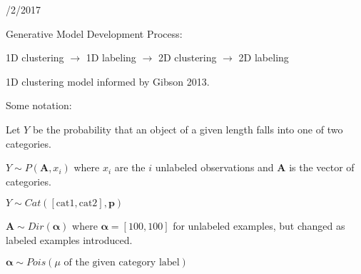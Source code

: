 \documentclass[12pt]{article}
\renewcommand{\vec}[1]{\mathbf{#1}}
\begin{document}
\newpage

/2/2017

\vspace{.2in}

\noindent Generative Model Development Process:

1D clustering $\rightarrow$ 1D labeling $\rightarrow$ 2D clustering $\rightarrow$ 2D labeling

\vspace{.2in}

1D clustering model informed by Gibson 2013.

Some notation:

\vspace{.1in}

Let $Y$ be the probability that an object of a given length falls into one of two categories.

$Y \sim P(\vec{A}, x_i)$ where $x_i$ are the $i$ unlabeled observations and $\vec{A}$ is the vector of categories.

$Y \sim Cat([\text{cat1},\text{cat2}],\vec{p})$

$\vec{A} \sim Dir(\vec{\alpha})$ where $\vec{\alpha} = [100,100]$ for unlabeled examples, but changed as labeled examples introduced.

$\vec{\alpha} \sim Pois(\mu \text{ of the given category label})$
\end{document}
